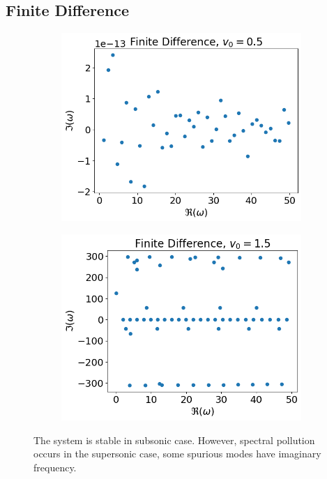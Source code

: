 \subsection{Finite Difference}
\begin{figure}[H]
	\centering
	\begin{subfigure}[b]{0.5\textwidth}
		\includegraphics[width=\linewidth]{img/constant_v/eigenvals-fd-v0=0.5}
	\end{subfigure}%
	\begin{subfigure}[b]{0.5\textwidth}
		\includegraphics[width=\linewidth]{img/constant_v/eigenvals-fd-v0=1.5}
	\end{subfigure}
	\caption{The system is stable in subsonic case. However, spectral pollution occurs in the supersonic case, some spurious modes have imaginary frequency.}
	\label{fig:eigenvals-constant-v}
\end{figure}

